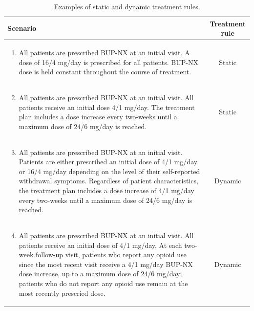 \documentclass[11pt]{article}
\theoremstyle{example}
\begin{document}
\begin{table}[H]
    \centering\footnotesize
    \caption{Examples of static and dynamic treatment rules.}
    \begin{tabular}{>{\arraybackslash} m{120mm} c }
    \toprule
    Scenario & Treatment rule \\
    \midrule
    \begin{enumerate}
        \item All patients are prescribed BUP-NX at an initial visit. A dose of 16/4 mg/day is prescribed for all patients. BUP-NX dose is held constant throughout the course of treatment.
    \end{enumerate} & Static \\
    \midrule
    \begin{enumerate}
        \setcounter{enumi}{1}
        \item All patients are prescribed BUP-NX at an initial visit. All patients receive an initial dose 4/1 mg/day. The treatment plan includes a dose increase every two-weeks until a maximum dose of 24/6 mg/day is reached.
    \end{enumerate} & Static \\
    \midrule
    \begin{enumerate}
        \setcounter{enumi}{2}
        \item All patients are prescribed BUP-NX at an initial visit. Patients are either prescribed an initial dose of 4/1 mg/day or 16/4 mg/day depending on the level of their self-reported withdrawal symptoms. Regardless of patient characteristics, the treatment plan includes a dose increase of 4/1 mg/day every two-weeks until a maximum dose of 24/6 mg/day is reached. 
    \end{enumerate} & Dynamic \\
    \midrule
    \begin{enumerate}
        \setcounter{enumi}{3}
        \item All patients are prescribed BUP-NX at an initial visit. All patients receive an initial dose of 4/1 mg/day. At each two-week follow-up visit, patients who report any opioid use since the most recent visit receive a 4/1 mg/day BUP-NX dose increase, up to a maximum dose of 24/6 mg/day; patients who do not report any opioid use remain at the most recently prescried dose. 
        \end{enumerate} & Dynamic \\
    \bottomrule
    \end{tabular}
    \label{tab:rule_examples}
\end{table}
		
\end{document}
